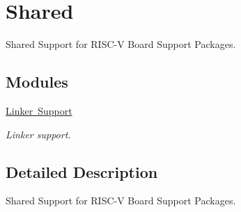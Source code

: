 \hypertarget{group__RTEMSBSPsRISCVShared}{}\section{Shared}
\label{group__RTEMSBSPsRISCVShared}


Shared Support for R\+I\+S\+C-\/V Board Support Packages.  


\subsection*{Modules}
\begin{DoxyCompactItemize}
\item 
\mbox{\hyperlink{group__RTEMSBSPsRISCVSharedLinker}{Linker Support}}
\begin{DoxyCompactList}\small\item\em Linker support. \end{DoxyCompactList}\end{DoxyCompactItemize}


\subsection{Detailed Description}
Shared Support for R\+I\+S\+C-\/V Board Support Packages. 

